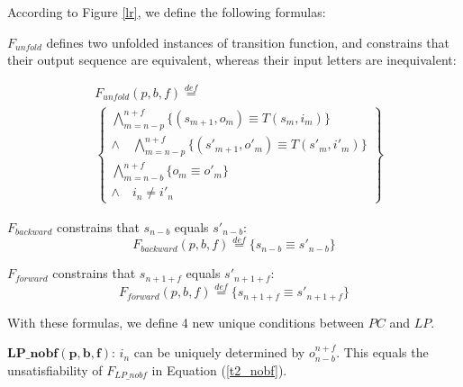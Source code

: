 \documentclass[journal]{IEEEtran}
\begin{document}
According to Figure \ref{lr},
we define the following formulas:

$F_{unfold}$ defines two unfolded instances of transition function,
and constrains that their output sequence are equivalent,
whereas their input letters are inequivalent:

\begin{equation}\label{F_unfold}
\begin{split}
&F_{unfold}(p,b,f)\overset{def}{=}\\
&\left\{
\begin{array}{c}
\bigwedge_{m=n-p}^{n+f}
\{
(s_{m+1},o_m)\equiv T(s_m,i_m)
\}
\\
\wedge\quad\bigwedge_{m=n-p}^{n+f}
\{
(s'_{m+1},o'_m)\equiv T(s'_m,i'_m)
\}
\\
\bigwedge_{m=n-b}^{n+f}\{o_m\equiv o'_m\}
\\
\wedge\quad i_n\ne i'_n
\end{array}
\right\}
\end{split}
\end{equation}

$F_{backward}$ constrains that $s_{n-b}$ equals $s'_{n-b}$:
\begin{equation}\label{F_b}
F_{backward}(p,b,f) \overset{def}{=}\{s_{n-b}\equiv s'_{n-b}\}
\end{equation}

$F_{forward}$ constrains that $s_{n+1+f}$ equals $s'_{n+1+f}$:
\begin{equation}\label{F_f}
F_{forward}(p,b,f) \overset{def}{=}\{s_{n+1+f}\equiv s'_{n+1+f}\}
\end{equation}


With these formulas,
we define 4 new unique conditions between $PC$ and $LP$.


\textbf{$\boldsymbol{LP\_nobf(p,b,f)}$}:
$i_n$ can be uniquely determined by $o_{n-b}^{n+f}$.
This equals the unsatisfiability of $F_{LP\_nobf}$ in Equation (\ref{t2_nobf}).
\end{document}
